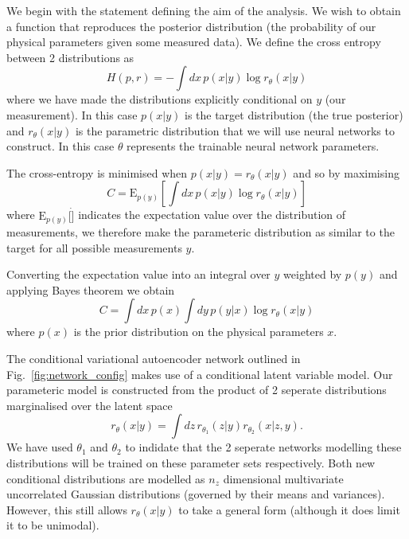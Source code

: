 \documentclass[%
showpacs,
 amsmath,amssymb,
 aps,
 twocolumn,
 prl,
 reprint,
floatfix,
]{revtex4-1}
\begin{document}
We begin with the statement defining the aim of the analysis. We wish to obtain
a function that reproduces the posterior distribution (the probability of our
physical parameters given some measured data). We define the cross entropy
between 2 distributions as
%
\begin{equation}\label{eq:cross_ent}
H(p,r) = -\int dx\, p(x|y) \log r_{\theta}(x|y)
\end{equation}
%
where we have made the distributions explicitly conditional on $y$ (our
measurement). In this case $p(x|y)$ is the target distribution (the true
posterior) and $r_{\theta}(x|y)$ is the parametric distribution that we will
use neural networks to construct. In this case $\theta$ represents the
trainable neural network parameters. 

The cross-entropy is minimised when $p(x|y)=r_{\theta}(x|y)$ and so by maximising
%
\begin{equation}\label{eq:cost1}
C = \text{E}_{p(y)}\left[\int dx\,p(x|y) \log r_{\theta}(x|y)\right]
\end{equation}
% 
where $\text{E}_{p(y)}[\dot]$ indicates the expectation value over the
distribution of measurements, we therefore make the parameteric distribution as
similar to the target for all possible measurements $y$.

Converting the expectation value into an integral over $y$ weighted by $p(y)$
and applying Bayes theorem we obtain
%
\begin{equation}\label{eq:cost1}
C = \int dx\,p(x)\int dy\,p(y|x)\log r_{\theta}(x|y)
\end{equation}
%
where $p(x)$ is the prior distribution on the physical parameters $x$.

The conditional variational autoencoder network outlined in
Fig.~\ref{fig:network_config} makes use of a conditional latent variable model.
Our parameteric model is constructed from the product of 2 seperate
distributions marginalised over the latent space
%
\begin{equation}\label{eq:latent_model}
r_{\theta}(x|y) = \int dz\,r_{\theta_{1}}(z|y)r_{\theta_{2}}(x|z,y).
\end{equation}
%  
We have used $\theta_{1}$ and $\theta_{2}$ to indidate that the 2 seperate
networks modelling these distributions will be trained on these parameter sets
respectively. Both new conditional distributions are modelled as $n_{z}$
dimensional multivariate uncorrelated Gaussian distributions (governed by their
means and variances). However, this still allows $r_{\theta}(x|y)$ to take a
general form (although it does limit it to be unimodal).  
\end{document}
